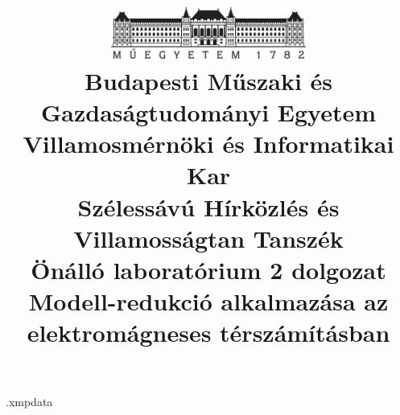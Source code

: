 \begin{filecontents*}[overwrite]{\jobname.xmpdata}
\end{filecontents*}

\documentclass[a4paper,12pt,titlepage]{article}
\usepackage{ucs}
\usepackage[T1]{fontenc}
\usepackage[utf8]{inputenc}
\usepackage[magyar]{babel}
\usepackage{amsfonts}
\usepackage{amsmath,bm}
\usepackage{amssymb}
\usepackage{graphicx}
\usepackage{subcaption}
\usepackage{blkarray,booktabs,bigstrut} %
\usepackage[left=20mm,right=20mm,top=20mm,bottom=25mm]{geometry}
\usepackage{hyperref}
\usepackage{listings}
\usepackage[range-phrase=--, range-units=single]{siunitx}
\usepackage{xcolor}
\usepackage[a-3u]{pdfx}

\DeclareMathOperator{\rot}{rot}
\DeclareMathOperator{\divergence}{div}

\sloppy %
\def\hyph{-\penalty0\hskip0pt\relax} %

\frenchspacing
\pagestyle{plain} 


\title{
    \centering
    \includegraphics[width=0.48\textwidth]{kep/bme_logo.pdf} \\
    \vspace{0.5cm}
    \large{\bf Budapesti Műszaki és Gazdaságtudományi Egyetem \\
    Villamosmérnöki és Informatikai Kar \\
    Szélessávú Hírközlés és Villamosságtan Tanszék}\\
    \vspace{4cm}
    \large{Önálló laboratórium 2 dolgozat} \\
    \vspace{2cm}
    \Large{\bf{Modell-redukció alkalmazása az elektromágneses térszámításban}} \\
    \vspace{2cm}
}

